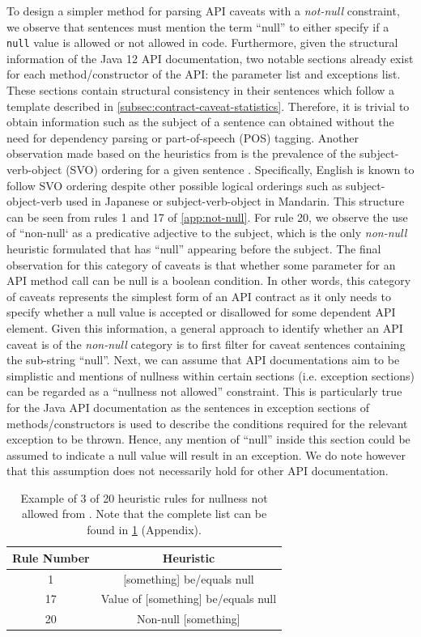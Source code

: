 To design a simpler method for parsing API caveats with a \textit{not-null} constraint, we observe that sentences must mention the term ``null'' to either specify if a \lstinline{null} value is allowed or not allowed in code. Furthermore, given the structural information of the Java 12 API documentation, two notable sections already exist for each method/constructor of the API: the parameter list and exceptions list. These sections contain structural consistency in their sentences which follow a template described in \ref{subsec:contract-caveat-statistics}. Therefore, it is trivial to obtain information such as the subject of a sentence can obtained without the need for dependency parsing or part-of-speech (POS) tagging. Another observation made based on the heuristics from \cite{zhou-directive} is the prevalence of the subject-verb-object (SVO) ordering for a given sentence \cite{dryer200581}. Specifically, English is known to follow SVO ordering despite other possible logical orderings such as subject-object-verb used in Japanese or subject-verb-object in Mandarin. This structure can be seen from rules 1 and 17 of \ref{app:not-null}. For rule 20, we observe the use of ``non-null` as a predicative adjective to the subject, which is the only \textit{non-null} heuristic formulated that has ``null'' appearing before the subject. The final observation for this category of caveats is that whether some parameter for an API method call can be null is a boolean condition. In other words, this category of caveats represents the simplest form of an API contract as it only needs to specify whether a null value is accepted or disallowed for some dependent API element. Given this information, a general approach to identify whether an API caveat is of the \textit{non-null} category is to first filter for caveat sentences containing the sub-string ``null''. Next, we can assume that API documentations aim to be simplistic and mentions of nullness within certain sections (i.e. exception sections) can be regarded as a ``nullness not allowed'' constraint. This is particularly true for the Java API documentation as the sentences in exception sections of methods/constructors is used to describe the conditions required for the relevant exception to be thrown. Hence, any mention of ``null'' inside this section could be assumed to indicate a null value will result in an exception. We do note however that this assumption does not necessarily hold for other API documentation. \\

\begin{table}[]
	\begin{tabular}{|cc|}
		\hline
		Rule Number & Heuristic \\ \hline
		1 & [something] be/equals null \\
		17 & Value of [something] be/equals null \\
		20 & Non-null [something] \\ \hline
	\end{tabular}
	\caption{Example of 3 of 20 heuristic rules for nullness not allowed from \cite{zhou-directive}. Note that the complete list can be found in \ref{tab:not-null-heuristic} (Appendix).}
	\label{tab:not-null-heuristic}
\end{table}

